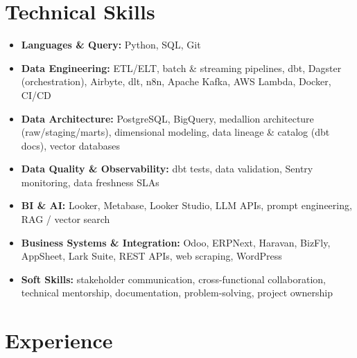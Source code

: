 \documentclass[letterpaper,10pt]{article}
\begin{document}
\section{Technical Skills}
\begin{itemize}[leftmargin=30pt, label=\textbullet, itemsep=1pt]
  \item \textbf{Languages \& Query:} Python, SQL, Git
  \item \textbf{Data Engineering:} ETL/ELT, batch \& streaming pipelines, dbt, Dagster (orchestration), Airbyte, dlt, n8n, Apache Kafka, AWS Lambda, Docker, CI/CD
  \item \textbf{Data Architecture:} PostgreSQL, BigQuery, medallion architecture (raw/staging/marts), dimensional modeling, data lineage \& catalog (dbt docs), vector databases
  \item \textbf{Data Quality \& Observability:} dbt tests, data validation, Sentry monitoring, data freshness SLAs
  \item \textbf{BI \& AI:} Looker, Metabase, Looker Studio, LLM APIs, prompt engineering, RAG / vector search
  \item \textbf{Business Systems \& Integration:} Odoo, ERPNext, Haravan, BizFly, AppSheet, Lark Suite, REST APIs, web scraping, WordPress
  \item \textbf{Soft Skills:} stakeholder communication, cross-functional collaboration, technical mentorship, documentation, problem-solving, project ownership
\end{itemize}


\section{Experience}
\end{document}
